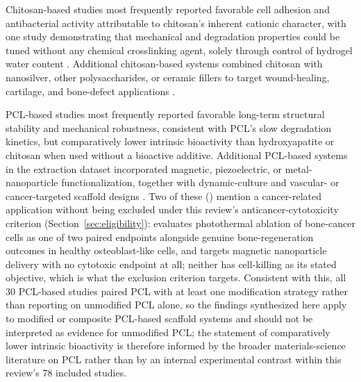 \documentclass[5p,times,twocolumn]{elsarticle}
\begin{document}
Chitosan-based studies most frequently reported favorable cell adhesion and antibacterial activity attributable to chitosan's inherent cationic character, with one study demonstrating that mechanical and degradation properties could be tuned without any chemical crosslinking agent, solely through control of hydrogel water content \cite{ref51}. Additional chitosan-based systems combined chitosan with nanosilver, other polysaccharides, or ceramic fillers to target wound-healing, cartilage, and bone-defect applications \cite{ref13,ref14,ref20,ref23,ref56,ref58}.

PCL-based studies most frequently reported favorable long-term structural stability and mechanical robustness, consistent with PCL's slow degradation kinetics, but comparatively lower intrinsic bioactivity than hydroxyapatite or chitosan when used without a bioactive additive. Additional PCL-based systems in the extraction dataset incorporated magnetic, piezoelectric, or metal-nanoparticle functionalization, together with dynamic-culture and vascular- or cancer-targeted scaffold designs \cite{ref21,ref29,ref38,ref47,ref49,ref64}. Two of these (\cite{ref47,ref64}) mention a cancer-related application without being excluded under this review's anticancer-cytotoxicity criterion (Section~\ref{sec:eligibility}): \cite{ref64} evaluates photothermal ablation of bone-cancer cells as one of two paired endpoints alongside genuine bone-regeneration outcomes in healthy osteoblast-like cells, and \cite{ref47} targets magnetic nanoparticle delivery with no cytotoxic endpoint at all; neither has cell-killing as its stated objective, which is what the exclusion criterion targets. Consistent with this, all 30 PCL-based studies paired PCL with at least one modification strategy rather than reporting on unmodified PCL alone, so the findings synthesized here apply to modified or composite PCL-based scaffold systems and should not be interpreted as evidence for unmodified PCL; the statement of comparatively lower intrinsic bioactivity is therefore informed by the broader materials-science literature on PCL rather than by an internal experimental contrast within this review's 78 included studies.
\end{document}
